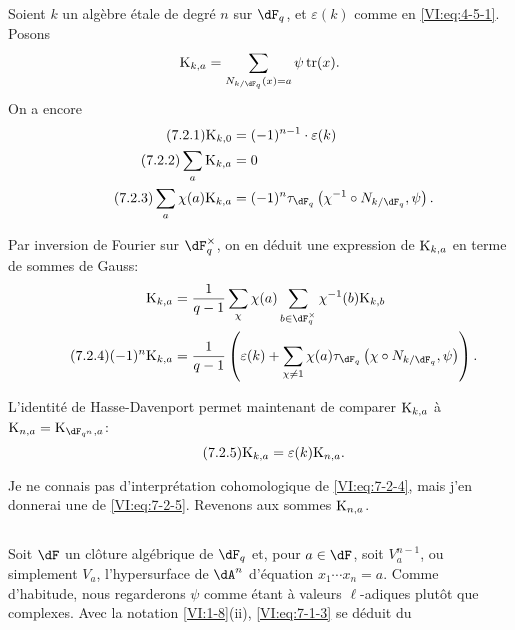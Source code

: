 \subsection{}\label{VI:7-2}

Soient $k$ un alg\`ebre \'etale de degr\'e $n$ sur $\dF_q$, et $\varepsilon(k)$ 
comme en \eqref{VI:eq:4-5-1}. Posons 
\[
  \kloos_{k,a} = \sum_{N_{k/\dF_q}(x)=a} \psi \tr(x) \text{.} 
\]
On a encore 
\begin{align*}\tag{7.2.1}\label{VI:eq:7-2-1}
  \kloos_{k,0} &= (-1)^{n-1} \cdot \varepsilon(k) \\ \tag{7.2.2}\label{VI:eq:7-2-2}
  \sum_a \kloos_{k,a} &= 0 \\ \tag{7.2.3}\label{VI:eq:7-2-3}
  \sum_a \chi(a) \kloos_{k,a} &= (-1)^n \tau_{\dF_q}\left(\chi^{-1}\circ N_{k/\dF_q},\psi\right) \text{.} 
\end{align*}

Par inversion de Fourier sur $\dF_q^\times$, on en d\'eduit une expression de 
$\textnormal{K}_{k,a}$ en terme de sommes de Gauss: 
\begin{align*} 
  \kloos_{k,a} &= \frac{1}{q-1} \sum_\chi \chi(a) \sum_{b\in \dF_q^\times} \chi^{-1}(b) \kloos_{k,b} \\ \tag{7.2.4}\label{VI:eq:7-2-4}
  (-1)^n \kloos_{k,a} &= \frac{1}{q-1} \left(\varepsilon(k) + \sum_{\chi\ne 1} \chi(a) \tau_{\dF_q}\left(\chi\circ N_{k/\dF_q},\psi\right) \right) \text{.} 
\end{align*}

L'identit\'e de Hasse-Davenport permet maintenant de comparer $\textnormal{K}_{k,a}$ 
\`a $\kloos_{n,a} = \kloos_{\dF_{q^n},a}$: 
\begin{equation*}\tag{7.2.5}\label{VI:eq:7-2-5}
  \textnormal{K}_{k,a} = \varepsilon(k) \textnormal{K}_{n,a} \text{.} 
\end{equation*}

Je ne connais pas d'interpr\'etation cohomologique de \eqref{VI:eq:7-2-4}, mais 
j'en donnerai une de \eqref{VI:eq:7-2-5}. Revenons aux sommes $\textnormal{K}_{n,a}$. 





\subsection{}\label{VI:7-3}

Soit $\dF$ un cl\^oture alg\'ebrique de $\dF_q$ et, pour $a\in \dF$, soit 
$V_a^{n-1}$, ou simplement $V_a$, l'hypersurface de $\dA^n$ d'\'equation 
$x_1 \dotsm x_n=a$. Comme d'habitude, nous regarderons $\psi$ comme \'etant \`a 
valeurs $\ell$-adiques plut\^ot que complexes. Avec la notation 
\ref{VI:1-8}(ii), \eqref{VI:eq:7-1-3} se d\'eduit du 






